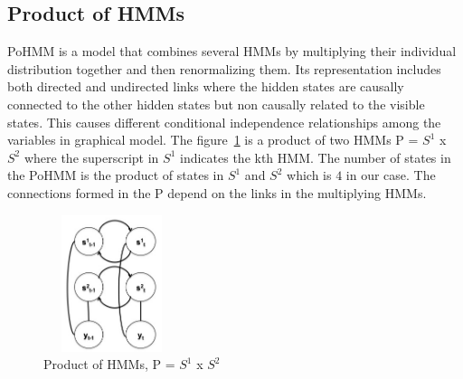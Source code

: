 \documentclass[runningheads,a4paper]{llncs}
\begin{document}

\subsection{Product of HMMs}
\label {pohmm}
PoHMM is a model that combines several HMMs by multiplying their individual distribution together and then renormalizing them. Its representation includes both directed and undirected links where the hidden states are causally connected to the other hidden states but non causally related to the visible states. This causes different conditional independence relationships among the variables in graphical model. 
The figure~\ref{fig:product} is a product of two HMMs P = $S^1$ x $S^2$ where the superscript in $S^1$ indicates the kth HMM. The number of states in the PoHMM is the product of states in $S^1$ and $S^2$ which is $4$ in our case. The connections formed in the P depend on the links in the multiplying HMMs. 



 \begin{figure}[!t]
\centering
\includegraphics[width=4cm,height=4cm]{product}
\caption{Product of HMMs, P = $S^{1}$ x $S^2$}
\label{fig:product}
\end{figure}
\end{document}
